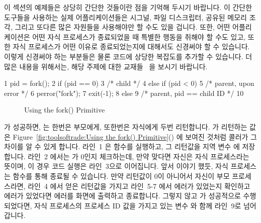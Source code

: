 이 섹션의 예제들은 상당히 간단한 것들이란 점을 기억해 두시기 바랍니다.
이 간단한 도구들을 사용하는 실제 어플리케이션들은 시그널, 파일 디스크립터,
공유된 메모리 조각, 그리고 또다른 많은 자원들을 사용해야만 할 수도 있을 겁니다.
또한, 어떤 어플리케이션은 어떤 자식 프로세스가 종료되었을 때 특별한 행동을
취해야 할 수도 있고, 또한 자식 프로세스가 어떤 이유로 종료되었는지에 대해서도
신경써야 할 수 있습니다.
이렇게 신경써야 하는 부분들은 물론 코드에 상당한 복잡도를 추가할 수 있습니다.
더 많은 내용을 위해서는, 해당 주제에 대한
교재들~\cite{WRichardStevens1992,StewartWeiss2013UNIX} 을 보시기 바랍니다.

{ \scriptsize
\begin{verbbox}
  1 pid = fork();
  2 if (pid == 0) {
  3   /* child */
  4 } else if (pid < 0) {
  5   /* parent, upon error */
  6   perror("fork");
  7   exit(-1);
  8 } else {
  9   /* parent, pid == child ID */
 10 }
\end{verbbox}
}
\begin{figure}[tbp]
\centering
\theverbbox
\caption{Using the fork() Primitive}
\label{fig:toolsoftrade:Using the fork() Primitive}
\end{figure}

 가 성공하면, 는 한번은 부모에게, 또한번은 자식에게 두번
리턴합니다.
 가 리턴하는 값은 Figure~\ref{fig:toolsoftrade:Using the fork()
Primitive}() 에 보여진 것처럼 콜러가 그 차이를 알 수 있게
합니다.
라인~1 은  함수를 실행하고, 그 리턴값을 지역 변수  에
저장합니다.
라인~2 에서는  가 0인지 체크하는데, 만약 맞다면 자신은 자식
프로세스라는 뜻이며, 이 경우 코드 실행은 라인~3으로 이어집니다.
앞서 이야기 했듯, 자식 프로세스는  함수를 통해 종료될 수 있습니다.
만약  리턴값이 0이 아니어서 자신이 부모 프로세스라면, 라인~4 에서
얻은  리턴값을 가지고 라인~5-7 에서 에러가 있었는지 확인하고 에러가
있었다면 에러를 화면에 출력하고 종료합니다.
그렇지 않고  가 성공적으로 수행되었다면, 자식 프로세스의 프로세스 ID
값을 가지고 있는 변수  와 함께 라인~9로 넘어갑니다.

